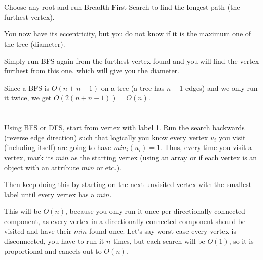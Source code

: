 \documentclass[11pt,letterpaper]{article}
\begin{document}
	\section{}
	Choose any root and run Breadth-First Search to find the longest path (the furthest vertex).
	
	You now have its eccentricity, but you do not know if it is the maximum one of the tree (diameter).
	
	Simply run BFS again from the furthest vertex found and you will find the vertex furthest from this one, which will give you the diameter.
	
	Since a BFS is $O(n+n-1)$ on a tree (a tree has $n-1$ edges) and we only run it twice, we get $O(2(n+n-1))=O(n)$.
	
	\section{}
	Using BFS or DFS, start from vertex with label 1. Run the search backwards (reverse edge direction) such that logically you know every vertex $u_i$ you visit (including itself) are going to have $min_i(u_i)=1$. Thus, every time you visit a vertex, mark its $min$ as the starting vertex (using an array or if each vertex is an object with an attribute $min$ or etc.).
	
	Then keep doing this by starting on the next unvisited vertex with the smallest label until every vertex has a $min$.
	
	This will be $O(n)$, because you only run it once per directionally connected component, as every vertex in a directionally connected component should be visited and have their $min$ found once. Let's say worst case every vertex is disconnected, you have to run it $n$ times, but each search will be $O(1)$, so it is proportional and cancels out to $O(n)$.
	
\end{document}

